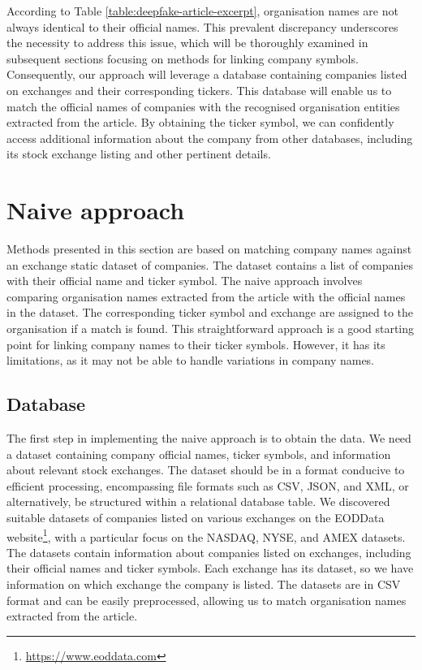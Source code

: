 According to Table \ref{table:deepfake-article-excerpt}, organisation names are not always identical to their official names. This prevalent discrepancy underscores the necessity to address this issue, which will be thoroughly examined in subsequent sections focusing on methods for linking company symbols. Consequently, our approach will leverage a database containing companies listed on exchanges and their corresponding tickers. This database will enable us to match the official names of companies with the recognised organisation entities extracted from the article. By obtaining the ticker symbol, we can confidently access additional information about the company from other databases, including its stock exchange listing and other pertinent details.

\section{Naive approach}
\label{sec:naive-approach}
Methods presented in this section are based on matching company names against an exchange static dataset of companies. The dataset contains a list of companies with their official name and ticker symbol. The naive approach involves comparing organisation names extracted from the article with the official names in the dataset. The corresponding ticker symbol and exchange are assigned to the organisation if a match is found. This straightforward approach is a good starting point for linking company names to their ticker symbols. However, it has its limitations, as it may not be able to handle variations in company names.

\subsection{Database}
\label{subsec:data-preparation}
The first step in implementing the naive approach is to obtain the data. We need a dataset containing company official names, ticker symbols, and information about relevant stock exchanges. The dataset should be in a format conducive to efficient processing, encompassing file formats such as CSV, JSON, and XML, or alternatively, be structured within a relational database table. We discovered suitable datasets of companies listed on various exchanges on the EODData website\footnote{\href{https://www.eoddata.com}{https://www.eoddata.com}}, with a particular focus on the NASDAQ, NYSE, and AMEX datasets. The datasets contain information about companies listed on exchanges, including their official names and ticker symbols. Each exchange has its dataset, so we have information on which exchange the company is listed. The datasets are in CSV format and can be easily preprocessed, allowing us to match organisation names extracted from the article.

